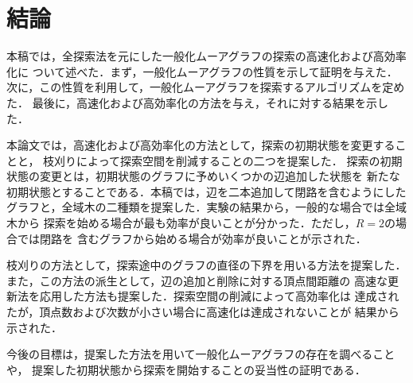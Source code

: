 
\chapter{結論}
本稿では，全探索法を元にした一般化ムーアグラフの探索の高速化および高効率化に
ついて述べた．まず，一般化ムーアグラフの性質を示して証明を与えた．
次に，この性質を利用して，一般化ムーアグラフを探索するアルゴリズムを定めた．
最後に，高速化および高効率化の方法を与え，それに対する結果を示した．

本論文では，高速化および高効率化の方法として，探索の初期状態を変更することと，
枝刈りによって探索空間を削減することの二つを提案した．
探索の初期状態の変更とは，初期状態のグラフに予めいくつかの辺追加した状態を
新たな初期状態とすることである．本稿では，辺を二本追加して閉路を含むようにした
グラフと，全域木の二種類を提案した．実験の結果から，一般的な場合では全域木から
探索を始める場合が最も効率が良いことが分かった．ただし，$R=2$の場合では閉路を
含むグラフから始める場合が効率が良いことが示された．

枝刈りの方法として，探索途中のグラフの直径の下界を用いる方法を提案した．
また，この方法の派生として，辺の追加と削除に対する頂点間距離の
高速な更新法を応用した方法も提案した．探索空間の削減によって高効率化は
達成されたが，頂点数および次数が小さい場合に高速化は達成されないことが
結果から示された．

今後の目標は，提案した方法を用いて一般化ムーアグラフの存在を調べることや，
提案した初期状態から探索を開始することの妥当性の証明である．
